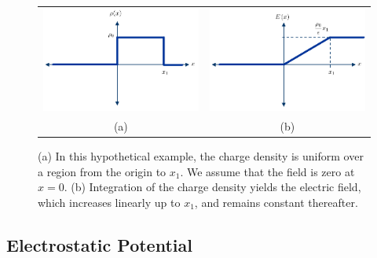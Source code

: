 \begin{figure}[tb]
\begin{center}
\begin{tabular}{cc}
\includegraphics[width=.4\columnwidth]{mod2-2_ICtech_sld_13} &
\includegraphics[width=.4\columnwidth]{mod2-2_ICtech_sld_13b} \\
(a) & (b) \\
\end{tabular}
\end{center}
\caption{(a) In this hypothetical example, the charge density is uniform over a region from the origin to $x_1$.  We assume that the field is zero at $x=0$.  (b) Integration of the charge density yields the electric field, which increases linearly up to $x_1$, and remains constant thereafter. } \label{fig:mod2-2_ICtech_sld_13}
\end{figure}




\subsection{Electrostatic Potential}


